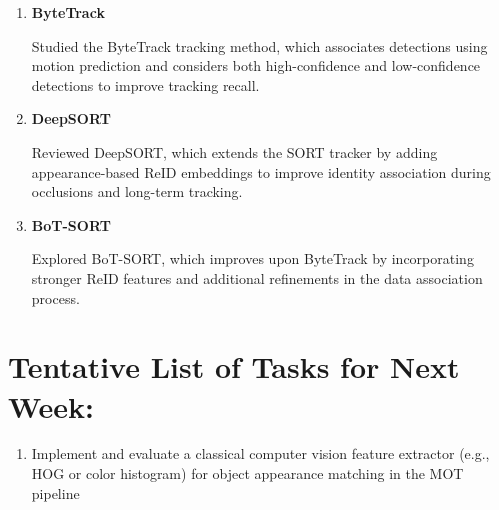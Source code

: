 \documentclass[11pt,a4paper]{article}
\begin{document}
	\begin{enumerate}[leftmargin=*]		
		\item \textbf{ByteTrack}
		
		Studied the ByteTrack tracking method, which associates detections using motion prediction and considers both 
		high-confidence and low-confidence detections to improve tracking recall.
		
		\item \textbf{DeepSORT}
		
		Reviewed DeepSORT, which extends the SORT tracker by adding appearance-based ReID embeddings to improve identity 
		association during occlusions and long-term tracking.
		
		\item \textbf{BoT-SORT}
		
		Explored BoT-SORT, which improves upon ByteTrack by incorporating stronger ReID features and additional refinements 
		in the data association process.
	\end{enumerate}
	
	\section*{Tentative List of Tasks for Next Week:}
	
	\begin{enumerate}[leftmargin=*]
		\item Implement and evaluate a classical computer vision feature extractor (e.g., HOG or color histogram) for object appearance matching in the MOT pipeline
	\end{enumerate}
	
\end{document}
